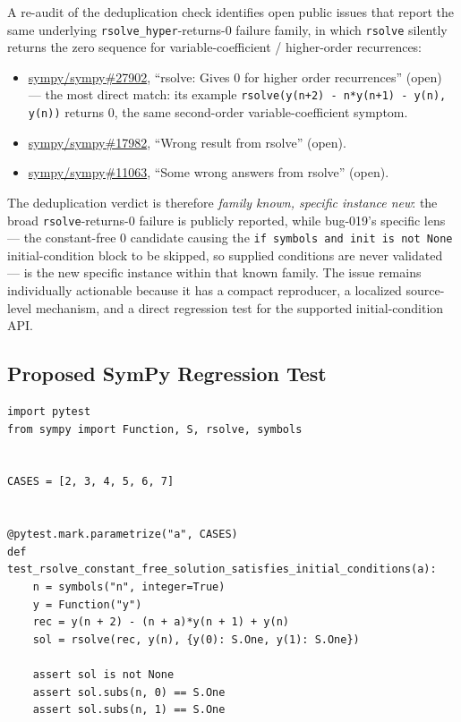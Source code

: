 \documentclass[11pt]{article}
\begin{document}
A re-audit of the deduplication check identifies open public issues that report
the same underlying \texttt{rsolve\_hyper}-returns-\(0\) failure family, in which
\texttt{rsolve} silently returns the zero sequence for variable-coefficient /
higher-order recurrences:
\begin{itemize}
  \item \href{https://github.com/sympy/sympy/issues/27902}{sympy/sympy\#27902},
  ``rsolve: Gives 0 for higher order recurrences'' (open) --- the most direct
  match: its example \texttt{rsolve(y(n+2) - n*y(n+1) - y(n), y(n))} returns
  \(0\), the same second-order variable-coefficient symptom.
  \item \href{https://github.com/sympy/sympy/issues/17982}{sympy/sympy\#17982},
  ``Wrong result from rsolve'' (open).
  \item \href{https://github.com/sympy/sympy/issues/11063}{sympy/sympy\#11063},
  ``Some wrong answers from rsolve'' (open).
\end{itemize}
The deduplication verdict is therefore \emph{family known, specific instance
new}: the broad \texttt{rsolve}-returns-\(0\) failure is publicly reported,
while bug-019's specific lens --- the constant-free \(0\) candidate causing the
\texttt{if symbols and init is not None} initial-condition block to be skipped,
so supplied conditions are never validated --- is the new specific instance
within that known family.  The issue remains individually actionable because it
has a compact reproducer, a localized source-level mechanism, and a direct
regression test for the supported initial-condition API.

\subsection{Proposed SymPy Regression Test}

\medskip

\begin{lstlisting}[style=bugpython]
import pytest
from sympy import Function, S, rsolve, symbols


CASES = [2, 3, 4, 5, 6, 7]


@pytest.mark.parametrize("a", CASES)
def test_rsolve_constant_free_solution_satisfies_initial_conditions(a):
    n = symbols("n", integer=True)
    y = Function("y")
    rec = y(n + 2) - (n + a)*y(n + 1) + y(n)
    sol = rsolve(rec, y(n), {y(0): S.One, y(1): S.One})

    assert sol is not None
    assert sol.subs(n, 0) == S.One
    assert sol.subs(n, 1) == S.One
\end{lstlisting}
\end{document}
